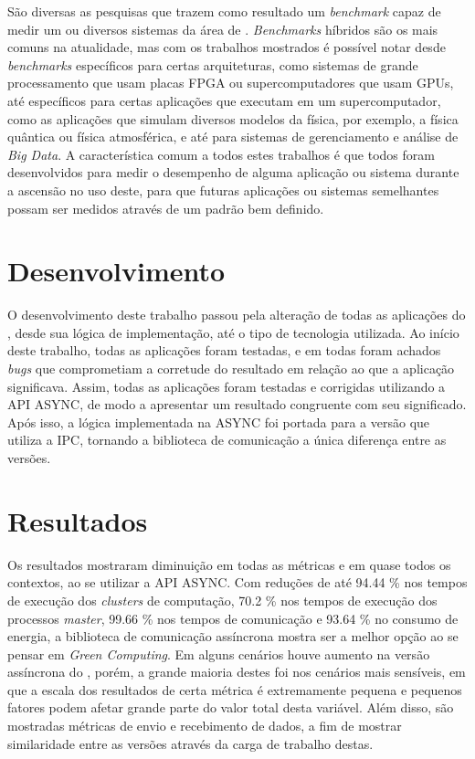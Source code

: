 \begin{resumo}
São diversas as pesquisas que trazem como resultado um \textit{benchmark} capaz de medir um ou diversos sistemas da área de \HPC. \textit{Benchmarks} híbridos são os mais comuns na atualidade, mas com os trabalhos mostrados é possível notar desde \textit{benchmarks} específicos para certas arquiteturas, como sistemas de grande processamento que usam placas FPGA ou supercomputadores que usam GPUs, até específicos para certas aplicações que executam em um supercomputador, como as aplicações que simulam diversos modelos da física, por exemplo, a física quântica ou física atmosférica, e até para sistemas de gerenciamento e análise de \textit{Big Data}. A característica comum a todos estes trabalhos é que todos foram desenvolvidos para medir o desempenho de alguma aplicação ou sistema durante a ascensão no uso deste, para que futuras aplicações ou sistemas semelhantes possam ser medidos através de um padrão bem definido.

\section*{Desenvolvimento} 

O desenvolvimento deste trabalho passou pela alteração de todas as aplicações do \capb, desde sua lógica de implementação, até o tipo de tecnologia utilizada. Ao início deste trabalho, todas as aplicações foram testadas, e em todas foram achados \textit{bugs} que comprometiam a corretude do resultado em relação ao que a aplicação significava. Assim, todas as aplicações foram testadas e corrigidas utilizando a API ASYNC, de modo a apresentar um resultado congruente com seu significado. Após isso, a lógica implementada na ASYNC foi portada para a versão que utiliza a IPC, tornando a biblioteca de comunicação a única diferença entre as versões.

\section*{Resultados} 

Os resultados mostraram diminuição em todas as métricas e em quase todos os contextos, ao se utilizar a API ASYNC. Com reduções de até 94.44 \% nos tempos de execução dos \textit{clusters} de computação, 70.2 \% nos tempos de execução dos processos \textit{master}, 99.66 \% nos tempos de comunicação e 93.64 \% no consumo de energia, a biblioteca de comunicação assíncrona mostra ser a melhor opção ao se pensar em \textit{Green Computing}. Em alguns cenários houve aumento na versão assíncrona do \capb, porém, a grande maioria destes foi nos cenários mais sensíveis, em que a escala dos resultados de certa métrica é extremamente pequena e pequenos fatores podem afetar grande parte do valor total desta variável. Além disso, são mostradas métricas de envio e recebimento de dados, a fim de mostrar similaridade entre as versões através da carga de trabalho destas.


\end{resumo}

